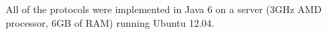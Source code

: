 
All of the protocols were implemented in Java 6 on a server (3GHz AMD processor, 6GB of RAM) running Ubuntu 12.04.
